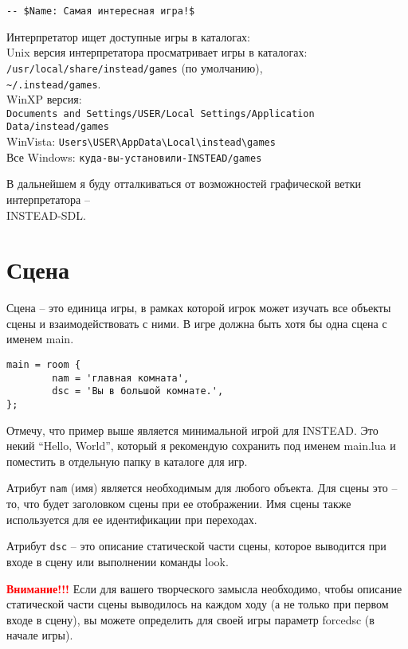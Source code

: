 \documentclass[a4paper,12pt]{article}
\begin{document}
\begin{verbatim}
-- $Name: Самая интересная игра!$
\end{verbatim}

Интерпретатор ищет доступные игры в каталогах:\\
Unix версия интерпретатора просматривает игры в каталогах:\\
\verb;/usr/local/share/instead/games; (по умолчанию),\\
\verb,~/.instead/games,.\\
WinXP версия:\\
\verb;Documents and Settings/USER/Local Settings/Application Data/instead/games;\\
WinVista: \verb;Users\USER\AppData\Local\instead\games;\\
Все Windows: \verb;куда-вы-установили-INSTEAD/games;

В дальнейшем я буду отталкиваться от возможностей графической ветки интерпретатора -- \\ INSTEAD-SDL.

\section{Сцена}

Сцена -- это единица игры, в рамках которой игрок может изучать все объекты сцены и взаимодействовать с ними. В игре должна быть хотя бы одна сцена с именем main.

\begin{verbatim}
main = room {
        nam = 'главная комната',
        dsc = 'Вы в большой комнате.',
};
\end{verbatim}

Отмечу, что пример выше является минимальной игрой для INSTEAD. Это некий ``Hello, World'', который я рекомендую сохранить под именем main.lua и поместить в отдельную папку в каталоге для игр.

Атрибут \verb/nam/ (имя) является необходимым для любого объекта. Для сцены это -- то, что будет заголовком сцены при ее отображении. Имя сцены также используется для ее идентификации при переходах.

Атрибут \verb/dsc/ -- это описание статической части сцены, которое выводится при входе в сцену или выполнении команды look.

\textbf{\textcolor{red}{Внимание!!!}} Если для вашего творческого замысла необходимо, чтобы описание статической части сцены выводилось на каждом ходу (а не только при первом входе в сцену), вы можете определить для своей игры параметр forcedsc (в начале игры).
\end{document}
